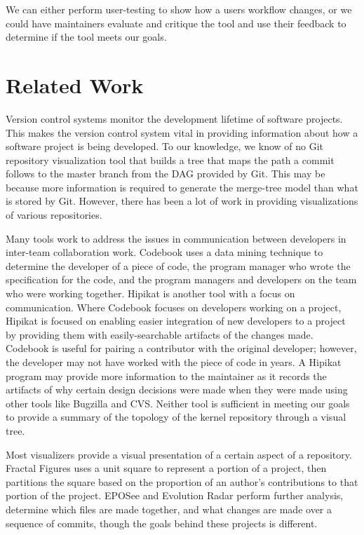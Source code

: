\documentclass[conference, draftclsnofoot, draft]{IEEEtran}
\begin{document}
We can either perform user-testing to show how a users workflow changes, or we could
have maintainers evaluate and critique the tool and use their feedback to determine
if the tool meets our goals.

\section{Related Work}

Version control systems monitor the development lifetime of software projects. This
makes the version control system vital in providing information about how a software
project is being developed. To our knowledge, we know of no Git repository
visualization tool that builds a tree that maps the path a commit follows to the
master branch from the DAG provided by Git. This may be because more information is
required to generate the merge-tree model than what is stored by Git. However, there
has been a lot of work in providing visualizations of various repositories.

Many tools work to address the issues in communication between developers in
inter-team collaboration work. Codebook \cite{Begel2010} uses a data mining
technique  to determine the developer of a piece of code, the program manager who
wrote the specification for the code, and the program managers and developers on the
team who were working together. Hipikat\cite{Cubranic2005} is another tool with a
focus on communication. Where Codebook focuses on developers working on a project,
Hipikat is focused on enabling easier integration of new developers to a project by
providing them with easily-searchable artifacts of the changes made. Codebook is
useful for pairing a contributor with the original developer; however, the developer
may not have worked with the piece of code in years. A Hipikat program may provide
more information to the maintainer as it records the artifacts of why certain
design decisions were made when they were made using other tools like Bugzilla and
CVS. Neither tool is sufficient in meeting our goals to provide a summary of the
topology of the kernel repository through a visual tree.

Most visualizers provide a visual presentation of a certain aspect of a repository.
Fractal Figures \cite{Ambros2005} uses a unit square to represent a portion of a
project, then partitions the square based on the proportion of an author's
contributions to that portion of the project. EPOSee\cite{Burch2005} and Evolution
Radar\cite{Ambros2009} perform further analysis, determine which files are made
together, and what changes are made over a sequence of commits, though the goals
behind these projects is different.
\end{document}
